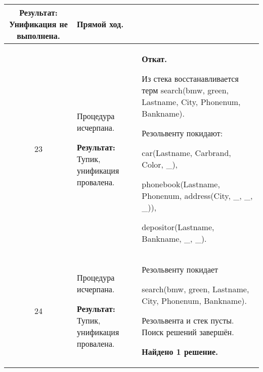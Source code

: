 \begin{longtable}{|c|p{}|p{}|}
    \textbf{Результат:} \newline
    Унификация не выполнена.
                       &
    \textbf{Прямой ход.}
                       \\ \hline

    23
                       &
    Процедура исчерпана.
    \newline

    \textbf{Результат:} \newline
    Тупик, унификация провалена.
                       &
    \textbf{Откат.}
    \newline

    Из стека восстанавливается терм \newline
  search(bmw, green, Lastname, City, Phonenum, Bankname).
    \newline

    Резольвенту покидают:

    car(Lastname, Carbrand, Color, \_),

    phonebook(Lastname, Phonenum, address(City, \_, \_, \_)),

    depositor(Lastname, Bankname, \_, \_).
                       \\ \hline

    24
                       &
    Процедура исчерпана.
    \newline

    \textbf{Результат:} \newline
    Тупик, унификация провалена.
                       &
    Резольвенту покидает

    search(bmw, green, Lastname, City, Phonenum, Bankname).
    \newline

    Резольвента и стек пусты. Поиск решений завершён.

    \textbf{Найдено 1 решение.}
                       \\ \hline
\end{longtable}
\normalsize

